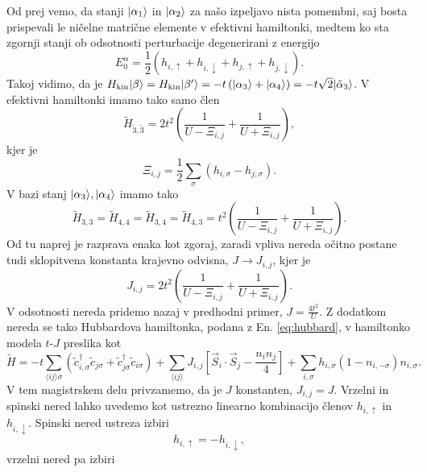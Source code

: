 \begin{appendices}
\begin{equation}
\end{equation}
Od prej vemo, da stanji $\vert\alpha_1\rangle$ in $\vert\alpha_2\rangle$ za našo izpeljavo nista pomembni, saj bosta prispevali le ničelne matrične elemente v efektivni hamiltonki, medtem ko sta zgornji stanji ob odsotnosti perturbacije degenerirani z energijo $$E_0^\alpha= \frac{1}{2} \left(h_{i,\uparrow} + h_{i,\downarrow} + h_{j,\uparrow} + h_{j,\downarrow}\right).$$ Takoj vidimo, da je 
$H_\mathrm{kin}\vert\beta\rangle= H_\mathrm{kin}\vert\beta'\rangle=-t\left(\vert\alpha_3\rangle+\vert\alpha_4\rangle\right)=-t\sqrt{2} \vert\tilde{\alpha}_3\rangle$. V efektivni hamiltonki imamo tako samo člen 
$$\tilde{H}_{\tilde{3},\tilde{3}}=2t^2\left(\frac{1}{U - \Xi_{i,j}} + \frac{1}{ U + \Xi_{i,j}}\right), $$
kjer je 
\begin{equation}\label{eq:izpeljava_vpeljava_xi}
\Xi_{i,j}=\frac{1}{2}\sum\limits_\sigma \left(h_{i,\sigma} - h_{j,\sigma}\right).
\end{equation}
V bazi stanj $\vert\alpha_3\rangle, \vert\alpha_4\rangle$ imamo tako 
$$
\tilde{H}_{3,3}=\tilde{H}_{4,4}=\tilde{H}_{3,4}=\tilde{H}_{4,3}=t^2\left( \frac{1}{U - \Xi_{i,j}} + \frac{1}{U + \Xi_{i,j}}\right).
$$
Od tu naprej je razprava enaka kot zgoraj, zaradi vpliva nereda očitno postane tudi sklopitvena konstanta krajevno odvisna, $J\rightarrow J_{i,j}$, kjer je 
\begin{equation}
J_{i,j}=2t^2 \left( \frac{1}{U-\Xi_{i,j}} + \frac{1}{U+ \Xi_{i,j}}\right).
\end{equation}
V odsotnosti nereda pridemo nazaj v predhodni primer, $J=\frac{4t^2}{U}$. Z dodatkom nereda se tako Hubbardova hamiltonka, podana z En. \eqref{eq:hubbard}, v hamiltonko modela $t$-$J$ preslika kot 
\begin{equation}
\tilde{H}=-t\sum\limits_{\langle ij \rangle \sigma} \left(\tilde{c}^\dagger_{i,\sigma} \tilde{c}_{j\sigma} + \tilde{c}^\dagger_{j\sigma}\tilde{c}_{i\sigma}\right) +\sum\limits_{\langle ij \rangle} J_{i,j}\left[ \vec{S}_i\cdot  \vec{S}_j - \frac{n_i n_j}{4}\right] +\sum\limits_{i,\sigma} h_{i,\sigma} \left(1-n_{i,-\sigma}\right)n_{i,\sigma}.
\end{equation}
V tem magistrskem delu privzamemo, da je $J$ konstanten, $J_{i,j}=J.$ Vrzelni in spinski nered lahko uvedemo kot ustrezno linearno kombinacijo členov $h_{i,\uparrow}$ in $h_{i,\downarrow}.$ Spinski nered ustreza izbiri
\begin{equation}\label{eq:izpeljava_vpeljava_spinski}
h_{i,\uparrow}=-h_{i,\downarrow},
\end{equation}
vrzelni nered pa izbiri 
\begin{equation}\label{eq:izpeljava_vpeljava_vrzelni}

\end{equation}
\end{appendices}
